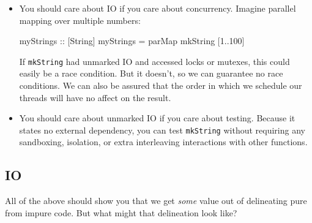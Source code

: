 \documentclass[]{article}
\newenvironment{Shaded}{}{}
\newcommand{\DataTypeTok}[1]{\textcolor[rgb]{0.56,0.13,0.00}{#1}}
\newcommand{\DecValTok}[1]{\textcolor[rgb]{0.25,0.63,0.44}{#1}}
\newcommand{\KeywordTok}[1]{\textcolor[rgb]{0.00,0.44,0.13}{\textbf{#1}}}
\newcommand{\NormalTok}[1]{#1}
\newcommand{\OperatorTok}[1]{\textcolor[rgb]{0.40,0.40,0.40}{#1}}
\newcommand{\OtherTok}[1]{\textcolor[rgb]{0.00,0.44,0.13}{#1}}
\begin{document}
\begin{itemize}
\begin{Shaded}
\begin{Highlighting}[]
\OtherTok{mkUser ::} \DataTypeTok{Int} \OtherTok{{-}\textgreater{}} \DataTypeTok{User}
\NormalTok{mkUser n }\OtherTok{=} \DataTypeTok{User}\NormalTok{ \{ name }\OtherTok{=}\NormalTok{ b, ident }\OtherTok{=}\NormalTok{ a \}}
  \KeywordTok{where}
\NormalTok{    a }\OtherTok{=}\NormalTok{ mkString n}
\NormalTok{    b }\OtherTok{=}\NormalTok{ mkString (n }\OperatorTok{+} \DecValTok{1}\NormalTok{)}
\NormalTok{    c }\OtherTok{=}\NormalTok{ mkString (n }\OperatorTok{+} \DecValTok{3}\NormalTok{)}
\end{Highlighting}
\end{Shaded}

  What\ldots what order are those \texttt{mkString}s called, in a lazy language?
  If there was unmarked IO, the order \emph{does} matter. If there wasn't, they
  \emph{can't}. And \texttt{c} could not even be freely discarded if there was
  unmarked IO.
\item
  You should care about IO if you care about concurrency. Imagine parallel
  mapping over multiple numbers:

\begin{Shaded}
\begin{Highlighting}[]
\OtherTok{myStrings ::}\NormalTok{ [}\DataTypeTok{String}\NormalTok{]}
\NormalTok{myStrings }\OtherTok{=}\NormalTok{ parMap mkString [}\DecValTok{1}\OperatorTok{..}\DecValTok{100}\NormalTok{]}
\end{Highlighting}
\end{Shaded}

  If \texttt{mkString} had unmarked IO and accessed locks or mutexes, this could
  easily be a race condition. But it doesn't, so we can guarantee no race
  conditions. We can also be assured that the order in which we schedule our
  threads will have no affect on the result.
\item
  You should care about unmarked IO if you care about testing. Because it states
  no external dependency, you can test \texttt{mkString} without requiring any
  sandboxing, isolation, or extra interleaving interactions with other
  functions.
\end{itemize}

\subsection{IO}\label{io}

All of the above should show you that we get \emph{some} value out of
delineating pure from impure code. But what might that delineation look like?
\end{document}
